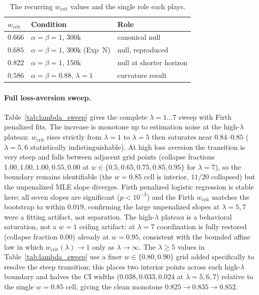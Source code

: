 \documentclass[letterpaper]{article} %
\theoremstyle{plain}
\newcommand{\wcrit}{w_{\mathrm{crit}}}
\begin{document}
\begin{table}[t]
\centering
\caption{The recurring $\wcrit$ values and the single role each plays.}
\label{tab:baselines}
\small
\begin{tabular}{lll}
\toprule
$\wcrit$ & Condition & Role \\
\midrule
$0.666$ & $\alpha{=}\beta{=}1$, 300k & canonical null \\
$0.685$ & $\alpha{=}\beta{=}1$, 300k (Exp~N) & null, reproduced \\
$0.822$ & $\alpha{=}\beta{=}1$, 150k & null at shorter horizon \\
$0.586$ & $\alpha{=}\beta{=}0.88$, $\lambda{=}1$ & curvature result \\
\bottomrule
\end{tabular}
\end{table}

\paragraph{Full loss-aversion sweep.}
Table~\ref{tab:lambda_sweep} gives the complete $\lambda{=}1{\dots}7$ sweep with Firth penalized
fits. The increase is monotone up to estimation noise at the high-$\lambda$ plateau:
$\wcrit$ rises strictly from $\lambda{=}1$ to $\lambda{=}5$ then saturates near $0.84$--$0.85$
($\lambda{=}5,6$ statistically indistinguishable). At high loss aversion the transition is
very steep and falls between adjacent grid points (collapse fractions $1.00,1.00,1.00,0.55,
0.00$ at $w\in\{0.5,0.65,0.75,0.85,0.95\}$ for $\lambda{=}7$), so the boundary remains
identifiable (the $w{=}0.85$ cell is interior, $11/20$ collapsed) but the unpenalized MLE
slope diverges. Firth penalized logistic regression is stable here; all seven slopes are
significant ($p<10^{-3}$) and the Firth $\wcrit$ matches the bootstrap to within $0.019$,
confirming the large unpenalized slopes at $\lambda{=}5,7$ were a fitting artifact, not
separation. The high-$\lambda$ plateau is a behavioral saturation, not a $w{=}1$ ceiling
artifact: at $\lambda{=}7$ coordination is fully restored (collapse fraction $0.00$) already
at $w{=}0.95$, consistent with the bounded affine law in which $\wcrit(\lambda)\to1$ only as
$\lambda\to\infty$. The $\lambda{\geq}5$ values in Table~\ref{tab:lambda_sweep} use a finer
$w\in\{0.80,0.90\}$ grid added specifically to resolve the steep transition; this places two
interior points across each high-$\lambda$ boundary and halves the CI widths
($0.038,0.033,0.024$ at $\lambda{=}5,6,7$) relative to the single $w{=}0.85$ cell, giving the
clean monotone $0.825\to0.835\to0.852$.
\end{document}
